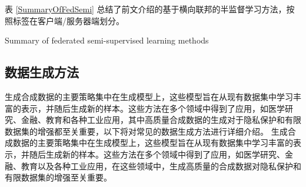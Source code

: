 表 \ref{SummaryOfFedSemi} 总结了前文介绍的基于横向联邦的半监督学习方法，按照标签在客户端/服务器端划分。
\vspace{-0.5cm}
\begin{table}[h]
	\centering
	{\songti \wuhao Summary of federated semi-supervised learning methods}
	\label{SummaryOfFedSemi}
\end{table}
\subsection{数据生成方法}
生成合成数据的主要策略集中在生成模型上，这些模型旨在从现有数据集中学习丰富的表示，并随后生成新的样本。这些方法在多个领域中得到了应用，如医学研究、金融、教育和各种工业应用，其中高质量合成数据的生成对于隐私保护和有限数据集的增强都至关重要，以下将对常见的数据生成方法进行详细介绍。  
生成合成数据的主要策略集中在生成模型上，这些模型旨在从现有数据集中学习丰富的表示，并随后生成新的样本。这些方法在多个领域中得到了应用，如医学研究、金融、教育以及各种工业应用，在这些领域中，生成高质量的合成数据对隐私保护和有限数据集的增强至关重要。

